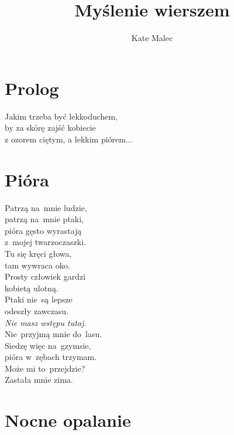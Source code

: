 \documentclass[12pt, a4paper]{memoir}
\title{Myślenie wierszem}
\author{Kate Malec}
\date{\the\year}
\renewenvironment{verse}{%
  \par\vspace{\baselineskip}\raggedright
}{
  \par\vspace{\baselineskip}
}
\begin{document}
\maketitle
\thispagestyle{empty}
\clearpage

\tableofcontents*
\clearpage

\section{Prolog}
\begin{verse}
Jakim trzeba być lekkoduchem,\\
by za skórę zajść kobiecie\\
z ozorem ciętym, a lekkim piórem...
\end{verse}

\clearpage

\section{Pióra}

\begin{verse}
Patrzą na~mnie ludzie,\\
patrzą na~mnie ptaki,\\
pióra gęsto wyrastają\\
z~mojej twarzoczaszki.\\[\baselineskip]
Tu się kręci głowa,\\
tam wywraca oko.\\
Prosty człowiek gardzi\\
kobietą ulotną.\\[\baselineskip]
Ptaki nie~są lepsze\\
odeszły zawczasu.\\
\textit{Nie masz wstępu tutaj.}\\
Nie~przyjmą mnie do~lasu.\\[\baselineskip]
Siedzę więc na~gzymsie,\\
pióra w~zębach trzymam.\\
Może mi to~przejdzie?\\[\baselineskip]
Zastała mnie zima.
\end{verse}

\clearpage

\section{Nocne opalanie}
\end{document}
